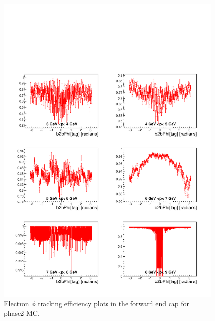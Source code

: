 \documentclass[a4paper,11pt,twosided,final,german,openbib,pdftex,listof=totoc,bibliography=totoc]{scrbook}
\begin{document}
\begin{appendix}
\begin{figure}[!htbp]
	\centering
	\includegraphics[width=\textwidth]{Plots/master/xPMPhiemFC_MC}
	\caption[Momentum $\phi$ Electron Forward End Cap Efficiency Phase2 MC]{Electron $\phi$ tracking efficiency plots in the forward end cap for phase2 MC.}
	\label{plt:PMPhiemFC_MC}
\end{figure}



\end{appendix}
\end{document}
